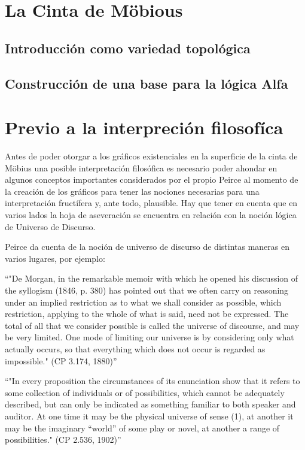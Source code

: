 \documentclass[
	fontsize=10pt, %
	twoside=false, %
	secnumdepth=1, %
	abstract=true, %
]{kaohandt}
\begin{document}
\section{La Cinta de Möbious} %
\label{sec:La Cinta de Möbius}

\subsection{Introducción como variedad topológica}


\subsection{Construcción de una base para la lógica Alfa}


\section{Previo a la interpreción filosofíca} %
\label{sec:Previo a la interpreción filosofíca}

Antes de poder otorgar a los gráficos existenciales en la superficie de la cinta de Möbius una posible interpretación filosófica es necesario poder ahondar en algunos conceptos importantes considerados por el propio Peirce al momento de la creación de los gráficos para tener las nociones necesarias para una interpretación fructífera y, ante todo, plausible. Hay que tener en cuenta que en varios lados la hoja de aseveración se encuentra en relación con la noción lógica de Universo de Discurso.

Peirce da cuenta de la noción de universo de discurso de distintas maneras en varios lugares, por ejemplo:

\enquote{"De Morgan, in the remarkable memoir with which he opened his discussion of the syllogism (1846, p. 380) has pointed out that we often carry on reasoning under an implied restriction as to what we shall consider as possible, which restriction, applying to the whole of what is said, need not be expressed. The total of all that we consider possible is called the universe of discourse, and may be very limited. One mode of limiting our universe is by considering only what actually occurs, so that everything which does not occur is regarded as impossible." (CP 3.174, 1880)}

\enquote{"In every proposition the circumstances of its enunciation show that it refers to some collection of individuals or of possibilities, which cannot be adequately described, but can only be indicated as something familiar to both speaker and auditor. At one time it may be the physical universe of sense (1), at another it may be the imaginary “world” of some play or novel, at another a range of possibilities." (CP 2.536, 1902)}
\end{document}
